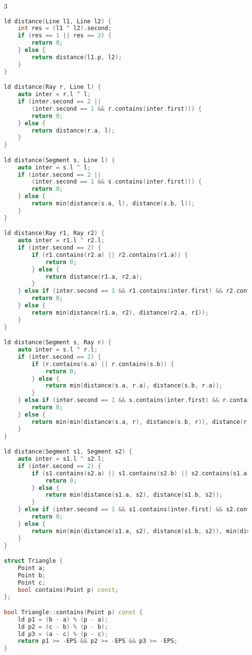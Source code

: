 \documentclass[10pt,a4paper,landscape,twosided]{extarticle}
\begin{document}
\begin{multicols}{3}
\begin{lstlisting}[language=C++]
ld distance(Line l1, Line l2) {
    int res = (l1 ^ l2).second;
    if (res == 1 || res == 2) {
        return 0;
    } else {
        return distance(l1.p, l2);
    }
}

ld distance(Ray r, Line l) {
    auto inter = r.l ^ l;
    if (inter.second == 2 ||
        (inter.second == 1 && r.contains(inter.first))) {
        return 0;
    } else {
        return distance(r.a, l);
    }
}

ld distance(Segment s, Line l) {
    auto inter = s.l ^ l;
    if (inter.second == 2 ||
        (inter.second == 1 && s.contains(inter.first))) {
        return 0;
    } else {
        return min(distance(s.a, l), distance(s.b, l));
    }
}

ld distance(Ray r1, Ray r2) {
    auto inter = r1.l ^ r2.l;
    if (inter.second == 2) {
        if (r1.contains(r2.a) || r2.contains(r1.a)) {
            return 0;
        } else {
            return distance(r1.a, r2.a);
        }
    } else if (inter.second == 1 && r1.contains(inter.first) && r2.contains(inter.first)) {
        return 0;
    } else {
        return min(distance(r1.a, r2), distance(r2.a, r1));
    }
}

ld distance(Segment s, Ray r) {
    auto inter = s.l ^ r.l;
    if (inter.second == 2) {
        if (r.contains(s.a) || r.contains(s.b)) {
            return 0;
        } else {
            return min(distance(s.a, r.a), distance(s.b, r.a));
        }
    } else if (inter.second == 1 && s.contains(inter.first) && r.contains(inter.first)) {
        return 0;
    } else {
        return min(min(distance(s.a, r), distance(s.b, r)), distance(r.a, s));
    }
}

ld distance(Segment s1, Segment s2) {
    auto inter = s1.l ^ s2.l;
    if (inter.second == 2) {
        if (s1.contains(s2.a) || s1.contains(s2.b) || s2.contains(s1.a) || s2.contains(s1.b)) {
            return 0;
        } else {
            return min(distance(s1.a, s2), distance(s1.b, s2));
        }
    } else if (inter.second == 1 && s1.contains(inter.first) && s2.contains(inter.first)) {
        return 0;
    } else {
        return min(min(distance(s1.a, s2), distance(s1.b, s2)), min(distance(s2.a, s1), distance(s2.b, s1)));
    }
}

struct Triangle {
    Point a;
    Point b;
    Point c;
    bool contains(Point p) const;
};

bool Triangle::contains(Point p) const {
    ld p1 = (b - a) % (p - a);
    ld p2 = (c - b) % (p - b);
    ld p3 = (a - c) % (p - c);
    return p1 >= -EPS && p2 >= -EPS && p3 >= -EPS;
}


\end{lstlisting}
\end{multicols}
\end{document}
